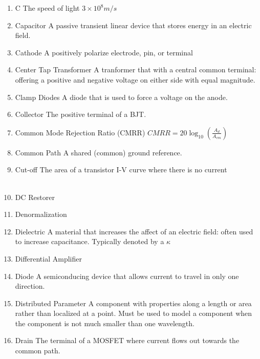 \documentclass{IEEEtran}
\begin{document}
\begin{enumerate}
\\
\item C
  \subitem The speed of light $3\times10^8 m/s$
\item Capacitor
  \subitem A passive transient linear device that stores energy in an electric field.\\
\item Cathode
  \subitem A positively polarize electrode, pin, or terminal\\
\item Center Tap Transformer
  \subitem A tranformer that with a central common terminal: offering a positive and negative voltage on either side with equal magnitude.\\
\item Clamp Diodes
  \subitem A diode that is used to force a voltage on the anode.\\
\item Collector
  \subitem The positive terminal of a BJT.\\
\item Common Mode Rejection Ratio (CMRR)
  \subitem $CMRR = 20\log_{10} \left(\frac{A_d}{A_{cm}}\right)$ \\
\item Common Path
\subitem A shared (common) ground reference. \\ 
\item Cut-off
  \subitem The area of a transistor I-V curve where there is no current \\

\\
\item DC Restorer
  \subitem \\
\item Denormalization
  \subitem \\ 
\item Dielectric
  \subitem A material that increases the affect of an electric field: often used to increase capacitance. Typically denoted by a $\kappa$ \\
\item Differential Amplifier
  \subitem \\
\item Diode
  \subitem A semiconducing device that allows current to travel in only one direction.\\
\item Distributed Parameter
  \subitem A component with properties along a length or area rather than localized at a point. Must be used to model a component when the component is not much smaller than one wavelength. \\ 
\item Drain
  \subitem The terminal of a MOSFET where current flows out towards the common path. \\


\end{enumerate}
\end{document}
